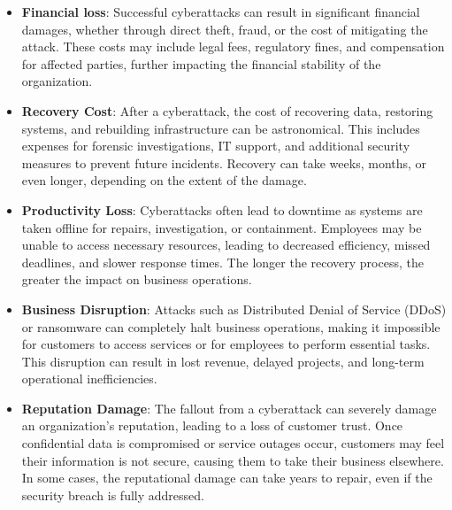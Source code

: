 \begin{itemize}
    \item \textbf{Financial loss}: Successful cyberattacks can result in significant financial damages, whether through direct theft, fraud, or the cost of mitigating the attack. These costs may include legal fees, regulatory fines, and compensation for affected parties, further impacting the financial stability of the organization.
    \item \textbf{Recovery Cost}: After a cyberattack, the cost of recovering data, restoring systems, and rebuilding infrastructure can be astronomical. This includes expenses for forensic investigations, IT support, and additional security measures to prevent future incidents. Recovery can take weeks, months, or even longer, depending on the extent of the damage.

\item \textbf{Productivity Loss}: Cyberattacks often lead to downtime as systems are taken offline for repairs, investigation, or containment. Employees may be unable to access necessary resources, leading to decreased efficiency, missed deadlines, and slower response times. The longer the recovery process, the greater the impact on business operations.

\item \textbf{Business Disruption}: Attacks such as Distributed Denial of Service (DDoS) or ransomware can completely halt business operations, making it impossible for customers to access services or for employees to perform essential tasks. This disruption can result in lost revenue, delayed projects, and long-term operational inefficiencies.

\item \textbf{Reputation Damage}: The fallout from a cyberattack can severely damage an organization's reputation, leading to a loss of customer trust. Once confidential data is compromised or service outages occur, customers may feel their information is not secure, causing them to take their business elsewhere. In some cases, the reputational damage can take years to repair, even if the security breach is fully addressed.
\end{itemize}

\clearpage

